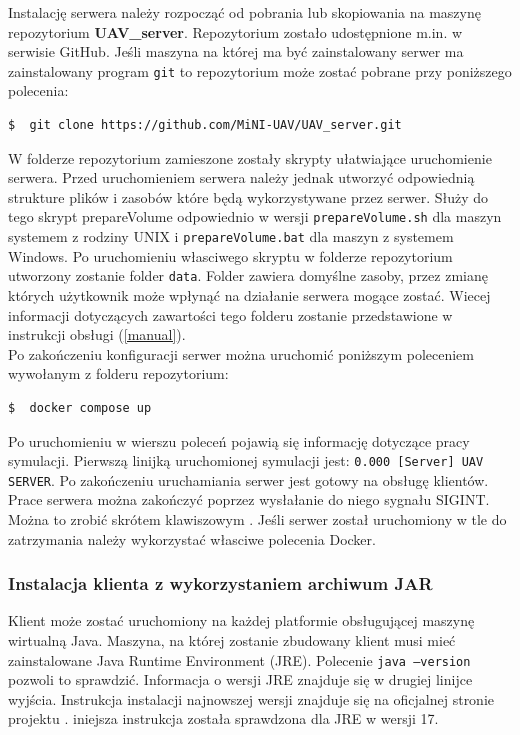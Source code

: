 \documentclass[15pt]{sprawozdanie}
\begin{document}
Instalację serwera należy rozpocząć od pobrania lub skopiowania na maszynę repozytorium \textbf{UAV\_server}. Repozytorium zostało udostępnione m.in. w serwisie GitHub. Jeśli maszyna na której ma być zainstalowany serwer ma zainstalowany program \texttt{git} to repozytorium może zostać pobrane przy poniższego polecenia:
\begin{lstlisting}[language=bash]
  $  git clone https://github.com/MiNI-UAV/UAV_server.git
\end{lstlisting}

W folderze repozytorium zamieszone zostały skrypty ułatwiające uruchomienie serwera. Przed uruchomieniem serwera należy jednak utworzyć odpowiednią strukture plików i zasobów które będą wykorzystywane przez serwer. Służy do tego skrypt prepareVolume odpowiednio w wersji  \texttt{prepareVolume.sh} dla maszyn systemem z rodziny UNIX i  \texttt{prepareVolume.bat} dla maszyn z systemem Windows. Po uruchomieniu własciwego skryptu w folderze repozytorium utworzony zostanie folder \texttt{data}. Folder zawiera domyślne zasoby, przez zmianę których użytkownik może wpłynąć na działanie serwera mogące zostać.  Wiecej informacji dotyczących zawartości tego folderu zostanie przedstawione w instrukcji obsługi (\ref{manual}).\\

Po zakończeniu konfiguracji serwer można uruchomić poniższym poleceniem wywołanym z folderu repozytorium:
\begin{lstlisting}[language=bash]
  $  docker compose up
\end{lstlisting}
Po uruchomieniu w wierszu poleceń pojawią się informację dotyczące pracy symulacji. Pierwszą linijką uruchomionej symulacji jest: \texttt{0.000 [Server] UAV SERVER}. Po zakończeniu uruchamiania serwer jest gotowy na obsługę klientów.\\

Prace serwera można zakończyć poprzez wysłałanie do niego sygnału SIGINT. Można to zrobić skrótem klawiszowym . Jeśli serwer został uruchomiony w tle do zatrzymania należy wykorzystać własciwe polecenia Docker.

\subsubsection{Instalacja klienta z wykorzystaniem archiwum JAR}
\label{javaInst}

Klient może zostać uruchomiony na każdej platformie obsługującej maszynę wirtualną Java. 
Maszyna, na której zostanie zbudowany klient musi mieć zainstalowane Java Runtime Environment (JRE). Polecenie \texttt{java --version} pozwoli to sprawdzić. Informacja o wersji JRE znajduje się w drugiej linijce wyjścia. Instrukcja instalacji najnowszej wersji znajduje się na oficjalnej stronie projektu \cite{java}. iniejsza instrukcja została sprawdzona dla JRE w wersji 17. \\
\end{document}
